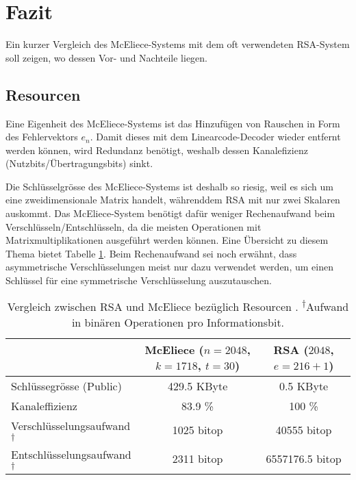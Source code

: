 %
%
%
\section{Fazit
\label{mceliece:section:fazit}}
Ein kurzer Vergleich des McEliece-Systems
mit dem oft verwendeten RSA-System soll zeigen, wo dessen Vor- und Nachteile liegen.

\subsection{Resourcen}
Eine Eigenheit des McEliece-Systems ist das Hinzufügen von Rauschen in Form des Fehlervektors $e_n$.
Damit dieses mit dem Linearcode-Decoder wieder entfernt werden können,
wird Redundanz benötigt,
weshalb dessen Kanalefizienz (Nutzbits/Übertragungsbits) sinkt.
%

Die Schlüsselgrösse des McEliece-Systems ist deshalb so riesig, weil es sich um eine zweidimensionale Matrix handelt, währenddem RSA mit nur zwei Skalaren auskommt.
%
Das McEliece-System benötigt dafür weniger Rechenaufwand beim Verschlüsseln/Entschlüsseln,
da die meisten Operationen mit Matrixmultiplikationen ausgeführt werden können.
%
Eine Übersicht zu diesem Thema bietet Tabelle \ref{mceliece:tab:comparison_effort}.
Beim Rechenaufwand sei noch erwähnt,
%
dass asymmetrische Verschlüsselungen meist nur dazu verwendet werden,
um einen Schlüssel für eine symmetrische Verschlüsselung auszutauschen.
\begin{table}
    \begin{center}
        \begin{tabular}{l|c|c}
                                        &McEliece ($n=2048$, $k=1718$, $t = 30$)  &RSA ($2048$, $e = 216 + 1$)\\
            \hline
            Schlüssegrösse (Public)    &429.5 KByte                        &0.5 KByte              \\
            Kanaleffizienz             &83.9 \%                            &100 \%                 \\
            Verschlüsselungsaufwand\textsuperscript{$\dagger$}    &1025 bitop                               &40555 bitop                  \\
            Entschlüsselungsaufwand\textsuperscript{$\dagger$}    &2311 bitop                           &6557176.5 bitop             \\
        \end{tabular}
    \end{center}
    \caption{\label{mceliece:tab:comparison_effort}Vergleich zwischen RSA und McEliece bezüglich Resourcen \cite{mceliece:CodeBasedCrypto}.%
    \quad\small\textsuperscript{$\dagger$}Aufwand in binären Operationen pro Informationsbit.}
\end{table}

